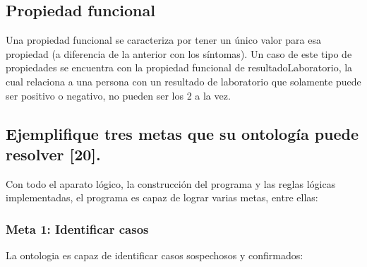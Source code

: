 \documentclass[11pt, letterpaper]{article}
\begin{document}
\subsection{Propiedad funcional}


Una propiedad funcional se caracteriza por tener un único valor para esa propiedad (a diferencia de la anterior con los síntomas). Un caso de este tipo de propiedades se encuentra con la propiedad funcional de resultadoLaboratorio, la cual relaciona a una persona con un resultado de laboratorio que solamente puede ser positivo o negativo, no pueden ser los 2 a la vez.


\newpage



\subsection{Ejemplifique tres metas que su ontología puede resolver [20].}

Con todo el aparato lógico, la construcción del programa y las reglas lógicas implementadas, el programa es capaz de lograr varias metas, entre ellas:

\subsubsection{Meta 1: Identificar casos}

La ontologia es capaz de identificar casos sospechosos y confirmados:
\end{document}

